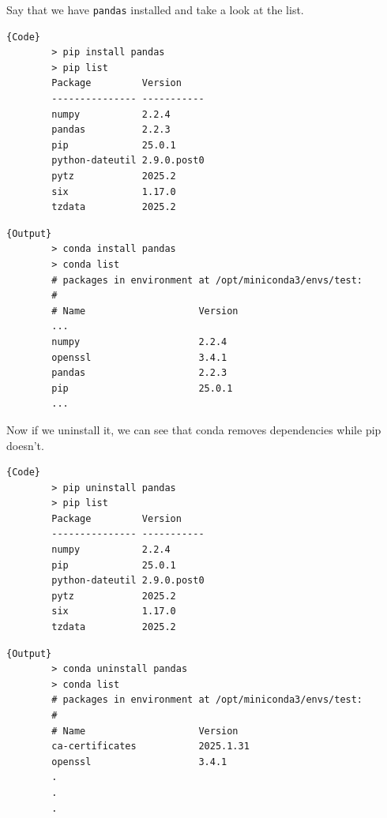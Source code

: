  \begin{example}
    \label{ex:uninstalling-package}
    Say that we have \texttt{pandas} installed and take a look at the list.
    
    \noindent\begin{minipage}{.35\textwidth}
      \begin{lstlisting}[]{Code}
        > pip install pandas 
        > pip list 
        Package         Version
        --------------- -----------
        numpy           2.2.4
        pandas          2.2.3
        pip             25.0.1
        python-dateutil 2.9.0.post0
        pytz            2025.2
        six             1.17.0
        tzdata          2025.2
      \end{lstlisting}
      \end{minipage}
      \hfill
      \begin{minipage}{.64\textwidth}
      \begin{lstlisting}[]{Output}
        > conda install pandas 
        > conda list
        # packages in environment at /opt/miniconda3/envs/test:
        #
        # Name                    Version       
        ...
        numpy                     2.2.4         
        openssl                   3.4.1         
        pandas                    2.2.3         
        pip                       25.0.1        
        ...
      \end{lstlisting}
    \end{minipage}

    Now if we uninstall it, we can see that conda removes dependencies while pip doesn't. 

    \noindent\begin{minipage}{.35\textwidth}
      \begin{lstlisting}[]{Code}
        > pip uninstall pandas 
        > pip list
        Package         Version
        --------------- -----------
        numpy           2.2.4
        pip             25.0.1
        python-dateutil 2.9.0.post0
        pytz            2025.2
        six             1.17.0
        tzdata          2025.2
      \end{lstlisting}
      \end{minipage}
      \hfill
      \begin{minipage}{.64\textwidth}
      \begin{lstlisting}[]{Output}
        > conda uninstall pandas 
        > conda list
        # packages in environment at /opt/miniconda3/envs/test:
        #
        # Name                    Version        
        ca-certificates           2025.1.31      
        openssl                   3.4.1          
        .
        .
        .
      \end{lstlisting}
    \end{minipage}
  \end{example} 

